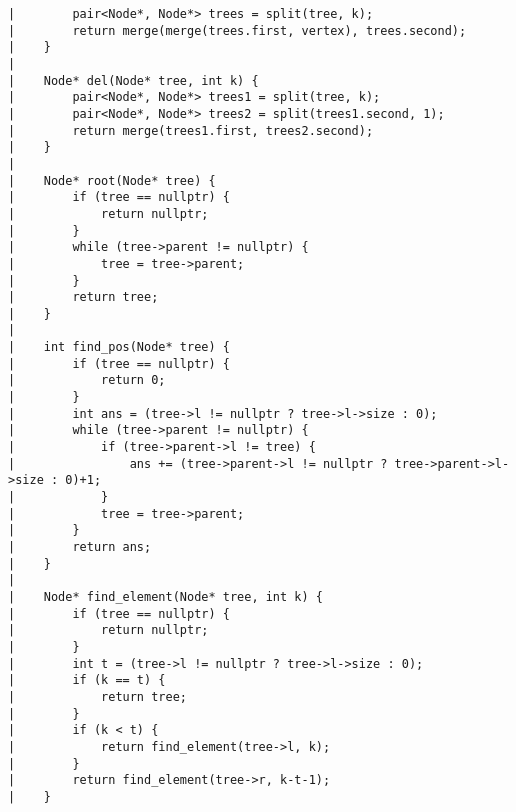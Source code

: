 \documentclass[a4paper, 10pt]{article}
\begin{document}
\begin{center}
\begin{verbatim}
|        pair<Node*, Node*> trees = split(tree, k);
|        return merge(merge(trees.first, vertex), trees.second);
|    }
|    
|    Node* del(Node* tree, int k) {
|        pair<Node*, Node*> trees1 = split(tree, k);
|        pair<Node*, Node*> trees2 = split(trees1.second, 1);
|        return merge(trees1.first, trees2.second);
|    }
|    
|    Node* root(Node* tree) {
|        if (tree == nullptr) {
|            return nullptr;
|        }
|        while (tree->parent != nullptr) {
|            tree = tree->parent;
|        }
|        return tree;
|    }
|    
|    int find_pos(Node* tree) {
|        if (tree == nullptr) {
|            return 0;
|        }
|        int ans = (tree->l != nullptr ? tree->l->size : 0);
|        while (tree->parent != nullptr) {
|            if (tree->parent->l != tree) {
|                ans += (tree->parent->l != nullptr ? tree->parent->l->size : 0)+1;
|            }
|            tree = tree->parent;
|        }
|        return ans;
|    }
|    
|    Node* find_element(Node* tree, int k) {
|        if (tree == nullptr) {
|            return nullptr;
|        }
|        int t = (tree->l != nullptr ? tree->l->size : 0);
|        if (k == t) {
|            return tree;
|        }
|        if (k < t) {
|            return find_element(tree->l, k);
|        }
|        return find_element(tree->r, k-t-1);
|    }
\end{verbatim}


\end{center}
\end{document}
